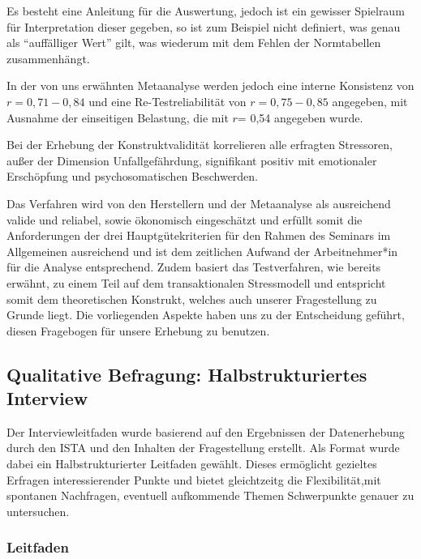 \documentclass[12pt, a4paper]{article}
\begin{document}
Es besteht eine Anleitung für die Auswertung, jedoch ist ein gewisser Spielraum für
Interpretation dieser gegeben, so ist zum Beispiel nicht definiert, was genau als “auffälliger
Wert” gilt, was wiederum mit dem Fehlen der Normtabellen zusammenhängt.

In der von uns erwähnten Metaanalyse werden jedoch eine interne Konsistenz von 
$r = 0,71-0,84$ und eine Re-Testreliabilität von $r =0,75-0,85$ angegeben, mit Ausnahme der
einseitigen Belastung, die mit $r$= 0,54 angegeben wurde.

Bei der Erhebung der Konstruktvalidität korrelieren alle erfragten Stressoren, außer der
Dimension Unfallgefährdung, signifikant positiv mit emotionaler Erschöpfung und
psychosomatischen Beschwerden.

Das Verfahren wird von den Herstellern und der Metaanalyse als ausreichend valide und
reliabel, sowie ökonomisch eingeschätzt und erfüllt somit die Anforderungen der drei
Hauptgütekriterien für den Rahmen des Seminars im Allgemeinen ausreichend und ist dem
zeitlichen Aufwand der Arbeitnehmer*in für die Analyse entsprechend. Zudem basiert das
Testverfahren, wie bereits erwähnt, zu einem Teil auf dem transaktionalen Stressmodell und
entspricht somit dem theoretischen Konstrukt, welches auch unserer Fragestellung zu
Grunde liegt. Die vorliegenden Aspekte haben uns zu der Entscheidung geführt, diesen
Fragebogen für unsere Erhebung zu benutzen.

\subsection{Qualitative Befragung: Halbstrukturiertes Interview}

Der Interviewleitfaden wurde basierend auf den Ergebnissen der Datenerhebung durch den 
ISTA und den Inhalten der Fragestellung erstellt. Als Format wurde dabei ein 
Halbstrukturierter Leitfaden gewählt. Dieses ermöglicht gezieltes Erfragen interessierender
Punkte und bietet gleichtzeitg die Flexibilität,mit spontanen Nachfragen, eventuell aufkommende Themen
Schwerpunkte genauer zu untersuchen. 

\subsubsection{Leitfaden}
\end{document}

